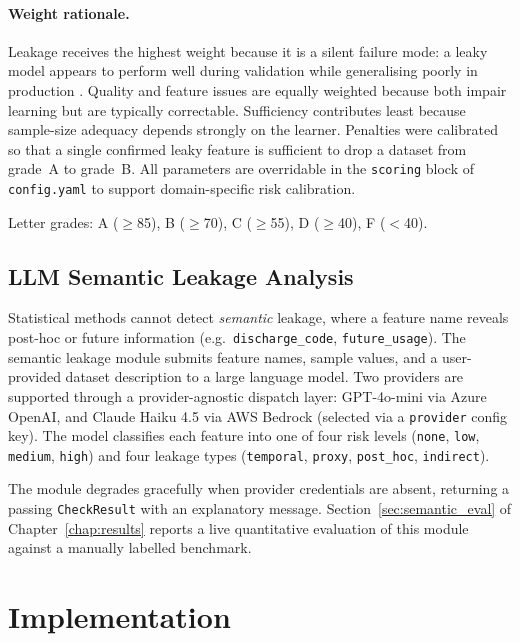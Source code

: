 \documentclass[12pt,a4paper]{report}
\begin{document}
\paragraph{Weight rationale.}  Leakage receives the highest weight because it is a silent
failure mode: a leaky model appears to perform well during validation while generalising
poorly in production \cite{kaufman2012leakage}.  Quality and feature issues are equally
weighted because both impair learning but are typically correctable.  Sufficiency contributes
least because sample-size adequacy depends strongly on the learner.  Penalties were
calibrated so that a single confirmed leaky feature is sufficient to drop a dataset from grade~A
to grade~B.  All parameters are overridable in the \texttt{scoring} block of
\texttt{config.yaml} to support domain-specific risk calibration.

Letter grades: A ($\ge$85), B ($\ge$70), C ($\ge$55), D ($\ge$40), F ($<$40).

\subsection{LLM Semantic Leakage Analysis}

Statistical methods cannot detect \emph{semantic} leakage, where a feature name reveals
post-hoc or future information (e.g.\ \texttt{discharge\_code}, \texttt{future\_usage}).
The semantic leakage module submits feature names, sample values, and a user-provided
dataset description to a large language model.  Two providers are supported through a
provider-agnostic dispatch layer: GPT-4o-mini via Azure OpenAI, and Claude Haiku 4.5 via
AWS Bedrock (selected via a \texttt{provider} config key). The model classifies each feature
into one of four risk levels (\texttt{none}, \texttt{low}, \texttt{medium}, \texttt{high})
and four leakage types (\texttt{temporal}, \texttt{proxy}, \texttt{post\_hoc},
\texttt{indirect}).

The module degrades gracefully when provider credentials are absent, returning a passing
\texttt{CheckResult} with an explanatory message.  Section~\ref{sec:semantic_eval} of
Chapter~\ref{chap:results} reports a live quantitative evaluation of this module against a
manually labelled benchmark.

\section{Implementation}
\label{sec:implementation}
\end{document}
